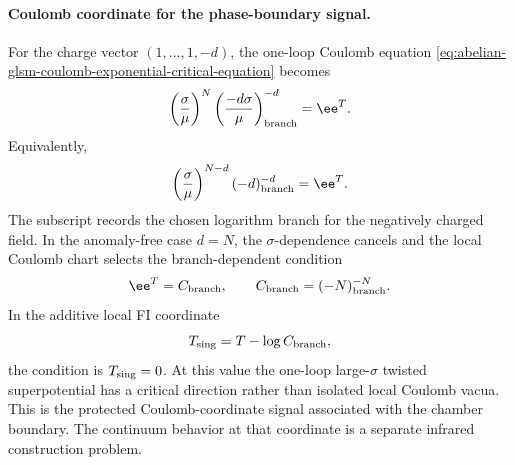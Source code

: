 \paragraph{Coulomb coordinate for the phase-boundary signal.}
For the charge vector \((1,\ldots,1,-d)\), the one-loop Coulomb equation
\eqref{eq:abelian-glsm-coulomb-exponential-critical-equation} becomes
\begin{equation}
  \left(\frac{\sigma}{\mu}\right)^N
  \left(\frac{-d\sigma}{\mu}\right)^{-d}_{\rm branch}
  =
  \ee^T .
  \label{eq:hypersurface-coulomb-charge-vector-equation}
\end{equation}
Equivalently,
\begin{equation}
  \left(\frac{\sigma}{\mu}\right)^{N-d}
  (-d)^{-d}_{\rm branch}
  =
  \ee^T .
  \label{eq:hypersurface-coulomb-power-equation}
\end{equation}
The subscript records the chosen logarithm branch for the negatively charged
field.  In the anomaly-free case \(d=N\), the \(\sigma\)-dependence cancels
and the local Coulomb chart selects the branch-dependent condition
\begin{equation}
  \ee^T=C_{\rm branch},
  \qquad
  C_{\rm branch}=(-N)^{-N}_{\rm branch}.
  \label{eq:hypersurface-coulomb-singular-coordinate}
\end{equation}
In the additive local FI coordinate
\[
  T_{\rm sing}=T-\log C_{\rm branch},
\]
the condition is \(T_{\rm sing}=0\).  At this value the one-loop large-\(\sigma\)
twisted superpotential has a critical direction rather than isolated local
Coulomb vacua.  This is the protected Coulomb-coordinate signal associated
with the chamber boundary.  The continuum behavior at that coordinate is a
separate infrared construction problem.

